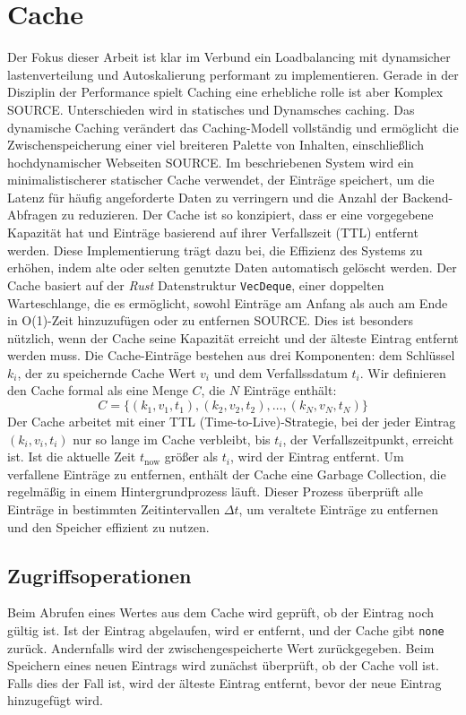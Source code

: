 \documentclass[twocolumn]{webofc}
\begin{document}
\section{Cache}
Der Fokus dieser Arbeit ist klar im Verbund ein Loadbalancing mit dynamsicher lastenverteilung und Autoskalierung performant zu implementieren. Gerade in der Disziplin der Performance spielt Caching eine erhebliche rolle ist aber Komplex {\color{red} SOURCE}. Unterschieden wird in statisches und Dynamsches caching. Das dynamische Caching verändert das Caching-Modell vollständig und ermöglicht die Zwischenspeicherung einer viel breiteren Palette von Inhalten, einschließlich hochdynamischer Webseiten {\color{red} SOURCE}. Im beschriebenen System wird ein minimalistischerer statischer Cache verwendet, der Einträge speichert, um die Latenz für häufig angeforderte Daten zu verringern und die Anzahl der Backend-Abfragen zu reduzieren. Der Cache ist so konzipiert, dass er eine vorgegebene Kapazität hat und Einträge basierend auf ihrer Verfallszeit (TTL) entfernt werden. Diese Implementierung trägt dazu bei, die Effizienz des Systems zu erhöhen, indem alte oder selten genutzte Daten automatisch gelöscht werden. Der Cache basiert auf der \textit{Rust} Datenstruktur \texttt{VecDeque}, einer doppelten Warteschlange, die es ermöglicht, sowohl Einträge am Anfang als auch am Ende in O(1)-Zeit hinzuzufügen oder zu entfernen {\color{red} SOURCE}. Dies ist besonders nützlich, wenn der Cache seine Kapazität erreicht und der älteste Eintrag entfernt werden muss. Die Cache-Einträge bestehen aus drei Komponenten:  dem Schlüssel \( k_i \), der zu speichernde Cache Wert \( v_i \) und dem Verfallssdatum \( t_i \). Wir definieren den Cache formal als eine Menge \( C \), die \( N \) Einträge enthält:
\[
C = \{ (k_1, v_1, t_1), (k_2, v_2, t_2), \dots, (k_N, v_N, t_N) \}
\]
Der Cache arbeitet mit einer TTL (Time-to-Live)-Strategie, bei der jeder Eintrag \( (k_i, v_i, t_i) \) nur so lange im Cache verbleibt, bis \( t_i \), der Verfallszeitpunkt, erreicht ist. Ist die aktuelle Zeit \( t_{\text{now}} \) größer als \( t_i \), wird der Eintrag entfernt. Um verfallene Einträge zu entfernen, enthält der Cache eine Garbage Collection, die regelmäßig in einem Hintergrundprozess läuft. Dieser Prozess überprüft alle Einträge in bestimmten Zeitintervallen \( \Delta t \), um veraltete Einträge zu entfernen und den Speicher effizient zu nutzen.

\subsection{Zugriffsoperationen}
Beim Abrufen eines Wertes aus dem Cache wird geprüft, ob der Eintrag noch gültig ist. Ist der Eintrag abgelaufen, wird er entfernt, und der Cache gibt \texttt{none} zurück. Andernfalls wird der zwischengespeicherte Wert zurückgegeben. Beim Speichern eines neuen Eintrags wird zunächst überprüft, ob der Cache voll ist. Falls dies der Fall ist, wird der älteste Eintrag entfernt, bevor der neue Eintrag hinzugefügt wird.
\end{document}
